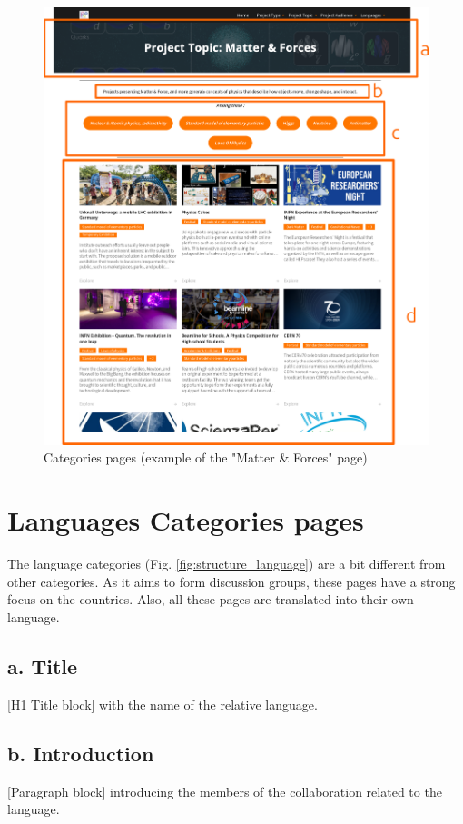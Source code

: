 \begin{figure}[p]
    \centering
    \includegraphics[width=\linewidth]{Image/Architecture/structure_category.png}
    \caption{Categories pages (example of the "Matter \& Forces" page)}
    \label{fig:structure_category}
\end{figure}
\newpage

\section{Languages Categories pages}\label{sec:structure_language}

The language categories (Fig. \ref{fig:structure_language}) are a bit different from other categories. As it aims to form discussion groups, these pages have a strong focus on the countries. Also, all these pages are translated into their own language.

\subsection*{a. Title}
[H1 Title block] with the name of the relative language.

\subsection*{b. Introduction}
[Paragraph block] introducing the members of the collaboration related to the language.

